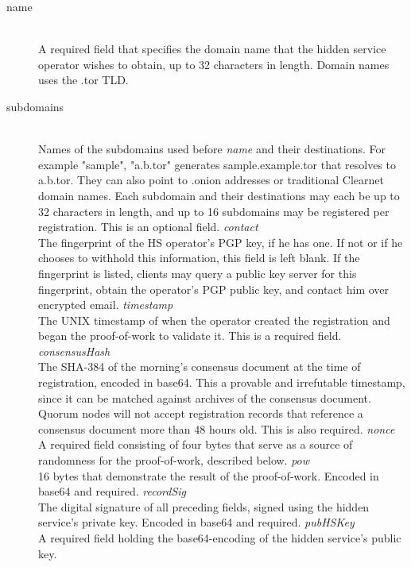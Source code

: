 \begin{description}
	\item[name] \hfill \\
		A required field that specifies the domain name that the hidden service operator wishes to obtain, up to 32 characters in length. Domain names uses the .tor TLD.
	\item[subdomains] \hfill \\
		Names of the subdomains used before \textit{name} and their destinations. For example {"sample", "a.b.tor"} generates sample.example.tor that resolves to a.b.tor. They can also point to .onion addresses or traditional Clearnet domain names. Each subdomain and their destinations may each be up to 32 characters in length, and up to 16 subdomains may be registered per registration. This is an optional field.
	\textit{contact} \hfill \\
		The fingerprint of the HS operator's PGP key, if he has one. If not or if he chooses to withhold this information, this field is left blank. If the fingerprint is listed, clients may query a public key server for this fingerprint, obtain the operator's PGP public key, and contact him over encrypted email.
	\textit{timestamp} \hfill \\
		The UNIX timestamp of when the operator created the registration and began the proof-of-work to validate it. This is a required field.
	\textit{consensusHash} \hfill \\
		The SHA-384 of the morning's consensus document at the time of registration, encoded in base64. This a provable and irrefutable timestamp, since it can be matched against archives of the consensus document. Quorum nodes will not accept registration records that reference a consensus document more than 48 hours old. This is also required.
	\textit{nonce} \hfill \\
		A required field consisting of four bytes that serve as a source of randomness for the proof-of-work, described below.
	\textit{pow} \hfill \\
		16 bytes that demonstrate the result of the proof-of-work. Encoded in base64 and required.
	\textit{recordSig} \hfill \\
		The digital signature of all preceding fields, signed using the hidden service's private key. Encoded in base64 and required.
	\textit{pubHSKey} \hfill \\
		A required field holding the base64-encoding of the hidden service's public key.
\end{description}


